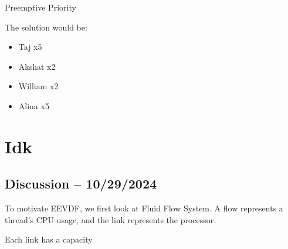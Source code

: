 \documentclass[openany]{book}
\begin{document}
\begin{hw}
	Preemptive Priority
\end{hw}
\begin{solution}
	The solution would be:
	\begin{itemize}
		\item Taj x5
		\item Akshat x2
		\item William x2
		\item Alina x5 
	\end{itemize}
\end{solution}

\chapter{Idk}
\section{Discussion -- 10/29/2024}
To motivate EEVDF, we first look at Fluid Flow System. A flow represents a thread's CPU usage, and the link represents the processor.

Each link has a capacity
\end{document}
